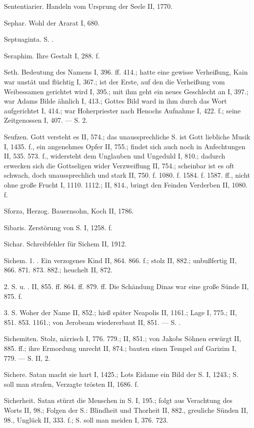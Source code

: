 Sententiarier. Handeln vom Ursprung der Seele II, 1770.

Sephar. Wohl der Ararat I, 680.

Septuaginta. S. .

Seraphim. Ihre Gestalt I, 288. f.

Seth. Bedeutung des Namens I, 396. ff. 414.; hatte eine gewisse Verheißung, Kain war unstät und flüchtig I, 367.; ist der Erste, auf den die Verheißung vom Weibessamen gerichtet wird I, 395.; mit ihm geht ein neues Geschlecht an I, 397.; war Adams Bilde ähnlich I, 413.; Gottes Bild ward in ihm durch das Wort aufgerichtet I, 414.; war Hoherpriester nach Henochs Aufnahme I, 422. f.; seine Zeitgenossen I, 407. — S.  2.

Seufzen. Gott versteht es II, 574.; das unaussprechliche S. ist Gott liebliche Musik I, 1435. f., ein angenehmes Opfer II, 755.; findet sich auch noch in Anfechtungen II, 535. 573. f., widersteht dem Unglauben und Ungeduld I, 810.; dadurch erwecken sich die Gottseligen wider Verzweiflung II, 754.; scheinbar ist es oft schwach, doch unaussprechlich und stark II, 750. f. 1080. f. 1584. f. 1587. ff., nicht ohne große Frucht I, 1110. 1112.; II, 814., bringt den Feinden Verderben II, 1080. f.

Sforza, Herzog. Bauernsohn, Koch II, 1786.

Sibaris. Zerstörung von S. I, 1258. f.

Sichar. Schreibfehler für Sichem II, 1912.

Sichem. 1. . Ein verzogenes Kind II, 864. 866. f.; stolz II, 882.; unbußfertig II, 866. 871. 873. 882.; heuchelt II, 872.

2. S. u. . II, 855. ff. 864. ff. 879. ff. Die Schändung Dinas war eine große Sünde II, 875. f.

3.  S. Woher der Name II, 852.; hieß später Neapolis II, 1161.; Lage I, 775.; II, 851. 853. 1161.; von Jerobeam wiedererbaut II, 851. — S. .

Sichemiten. Stolz, närrisch I, 776. 779.; II, 851.; von Jakobs Söhnen erwürgt II, 885. ff.; ihre Ermordung unrecht II, 874.; bauten einen Tempel auf Garizim I, 779. — S.  II, 2.

Sichere. Satan macht sie hart I, 1425.; Lots Eidame ein Bild der S. I, 1243.; S. soll man strafen, Verzagte trösten II, 1686. f.

Sicherheit. Satan stürzt die Menschen in S. I, 195.; folgt aus Verachtung des Worts II, 98.; Folgen der S.: Blindheit und Thorheit II, 882., greuliche Sünden II, 98., Unglück II, 333. f.; S. soll man meiden I, 376. 723.

